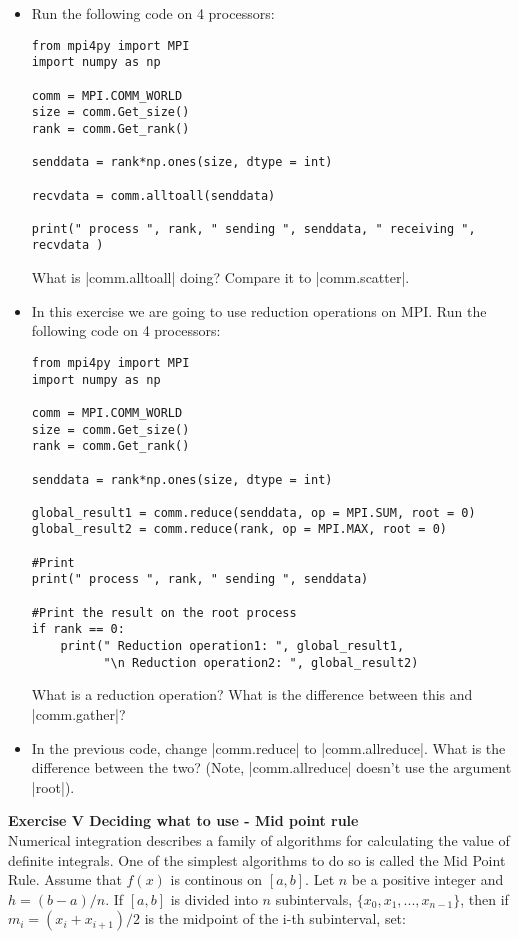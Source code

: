 \documentclass[11pt]{article}
\begin{document}
\begin{itemize}
   \item Run the following code on 4 processors:
   \begin{verbatim}
from mpi4py import MPI
import numpy as np

comm = MPI.COMM_WORLD
size = comm.Get_size()
rank = comm.Get_rank()

senddata = rank*np.ones(size, dtype = int)

recvdata = comm.alltoall(senddata)

print(" process ", rank, " sending ", senddata, " receiving ", recvdata )
   \end{verbatim}
   What is |comm.alltoall| doing? Compare it to |comm.scatter|.
   \item In this exercise we are going to use reduction operations on MPI. Run the following code on 4 processors:
   \begin{verbatim}
from mpi4py import MPI
import numpy as np

comm = MPI.COMM_WORLD
size = comm.Get_size()
rank = comm.Get_rank()

senddata = rank*np.ones(size, dtype = int)

global_result1 = comm.reduce(senddata, op = MPI.SUM, root = 0)
global_result2 = comm.reduce(rank, op = MPI.MAX, root = 0)

#Print
print(" process ", rank, " sending ", senddata)

#Print the result on the root process
if rank == 0:
    print(" Reduction operation1: ", global_result1,
          "\n Reduction operation2: ", global_result2)
   \end{verbatim}
   What is a reduction operation? What is the difference between this and |comm.gather|?
   \item In the previous code, change |comm.reduce| to |comm.allreduce|. What is the difference between the two? (Note, |comm.allreduce| doesn't use the argument |root|).
\end{itemize}


{\bf{Exercise V Deciding what to use - Mid point rule }}\\

Numerical integration describes a family of algorithms for calculating the value of definite integrals. One of the simplest algorithms to do so is called the Mid Point Rule. Assume that $f(x)$ is continous on $[a,b]$. Let $n$ be a positive integer and $h = (b-a)/n$. If $[a,b]$ is divided into $n$ subintervals, $\{ x_0, x_1, ..., x_{n-1} \}$, then if $m_i = (x_{i} + x_{i+1} )/2$ is the midpoint of the i-th subinterval, set:
\end{document}

